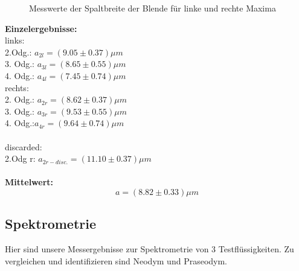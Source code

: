\documentclass[12pt,a4paper]{article}
\begin{document}
\begin{multicols}{2}
\begin{figure}[H]
	\centering
	\caption{Messwerte der Spaltbreite der Blende für linke und rechte Maxima}
	\label{tab:blendenbreite}
\end{figure}



\textbf{Einzelergebnisse:}\\
links:\\
2.Odg.: $a_{2l}=(9.05\pm 0.37) \mu m$\\
3. Odg.: $a_{3l}=(8.65 \pm 0.55) \mu m$\\
4. Odg.: $a_{4l}=(7.45\pm 0.74)\mu m$\\
rechts:\\
2. Odg.: $a_{2r}=(8.62\pm 0.37)\mu m$\\
3. Odg.: $a_{3r}=(9.53\pm 0.55) \mu m$\\
4. Odg.:$a_{4r}=(9.64 \pm 0.74) \mu m$\\
\\
discarded:\\
2.Odg r: $a_{2r-disc.}=(11.10 \pm 0.37)\mu m$\\
\\
\textbf{Mittelwert:}\\
$$a=(8.82 \pm 0.33)\mu m$$




\subsection{Spektrometrie}
Hier sind unsere Messergebnisse zur Spektrometrie von 3 Testflüssigkeiten. Zu vergleichen und identifizieren sind Neodym und Praseodym.

\end{multicols}
\end{document}
